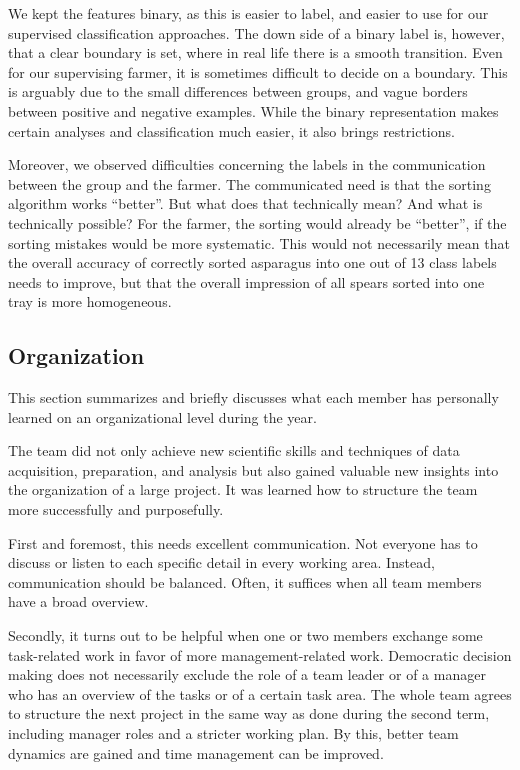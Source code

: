 We kept the features binary, as this is easier to label, and easier to use for our supervised classification approaches. The down side of a binary label is, however, that a clear boundary is set, where in real life there is a smooth transition. Even for our supervising farmer, it is sometimes difficult to decide on a boundary. This is arguably due to the small differences between groups, and vague borders between positive and negative examples. While the binary representation makes certain analyses and classification much easier, it also brings restrictions.

Moreover, we observed difficulties concerning the labels in the communication between the group and the farmer. The communicated need is that the sorting algorithm works \enquote{better}. But what does that technically mean? And what is technically possible? For the farmer, the sorting would already be \enquote{better}, if the sorting mistakes would be more systematic. This would not necessarily mean that the overall accuracy of correctly sorted asparagus into one out of 13 class labels needs to improve, but that the overall impression of all spears sorted into one tray is more homogeneous. 


\subsection{Organization}
\label{sec:DiscussionOrganization}

This section summarizes and briefly discusses what each member has personally learned on an organizational level during the year.

The team did not only achieve new scientific skills and techniques of data acquisition, preparation, and analysis but also gained valuable new insights into the organization of a large project. It was learned how to structure the team more successfully and purposefully.

\bigskip
First and foremost, this needs excellent communication. Not everyone has to discuss or listen to each specific detail in every working area. Instead, communication should be balanced. Often, it suffices when all team members have a broad overview.

Secondly, it turns out to be helpful when one or two members exchange some task-related work in favor of more management-related work. Democratic decision making does not necessarily exclude the role of a team leader or of a manager who has an overview of the tasks or of a certain task area. The whole team agrees to structure the next project in the same way as done during the second term, including manager roles and a stricter working plan. By this, better team dynamics are gained and time management can be improved.


